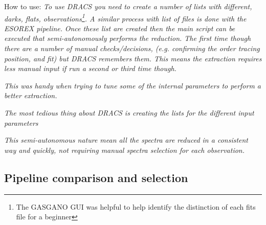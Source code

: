 How to use:
\textit{To use DRACS you need to create a number of lists with different, darks, flats, observations\footnote{The GASGANO GUI was helpful to help identify the distinction of each fits file for a beginner}. A similar process with list of files is done with the ESOREX pipeline.}
\textit{Once these list are created then the main script can be executed that semi-autonomously performs the reduction. The first time though there are a number of manual checks/decisions, (e.g. confirming the order tracing position, and fit) but DRACS remembers them. This means the extraction requires less manual input if run a second or third time though.}

\textit{This was handy when trying to tune some of the internal parameters to perform a better extraction.}


\textit{The most tedious thing about DRACS is creating the lists for the different input parameters}

\textit{This semi-autonomous nature mean all the spectra are reduced in a consistent way and quickly, not requiring manual spectra selection for each observation.}


\subsection{Pipeline comparison and selection}


